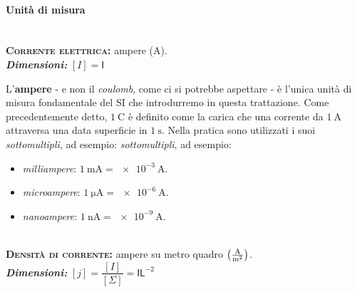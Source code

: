 \paragraph{Unità di misura}
\begin{units}~\\
	\textbf{\textsc{Corrente elettrica:}} ampere ($\unit{\ampere}$).\\
	\textit{\textbf{Dimensioni:}} $[I]=\mathsf{I}$
\end{units}
L'\textbf{ampere} - e non il \textit{coulomb}, come ci si potrebbe aspettare - è l'unica unità di misura fondamentale del SI che introdurremo in questa trattazione. Come precedentemente detto, $\SI{1}{\coulomb}$ è definito come la carica che una corrente da $\SI{1}{\ampere}$ attraversa una data superficie in $\SI{1}{\second}$.
Nella pratica sono utilizzati i suoi \textit{sottomultipli}, ad esempio:
\textit{sottomultipli}, ad esempio:
\begin{itemize}
	\item \textit{milliampere}: $\SI[per-mode = fraction,exponent-product=\ensuremath{\cdot}]{1}{\milli\ampere}=\SI[per-mode = fraction,exponent-product=\ensuremath{\cdot}]{e-3}{\ampere}$.
	\item \textit{microampere}: $\SI[per-mode = fraction,exponent-product=\ensuremath{\cdot}]{1}{\micro\ampere}=\SI[per-mode = fraction,exponent-product=\ensuremath{\cdot}]{e-6}{\ampere}$.
	\item \textit{nanoampere}: $\SI[per-mode = fraction,exponent-product=\ensuremath{\cdot}]{1}{\nano\ampere}=\SI[per-mode = fraction,exponent-product=\ensuremath{\cdot}]{e-9}{\ampere}$.
\end{itemize}
\begin{units}~\\
	\textbf{\textsc{Densità di corrente:}} ampere su metro quadro $\left(\unit[per-mode = fraction]{\ampere\per\square\meter}\right)$.\\
	\textit{\textbf{Dimensioni:}} $[j]=\dfrac{[I]}{[\Sigma]}=\mathsf{I}\mathsf{L}^{-2}$
\end{units}
